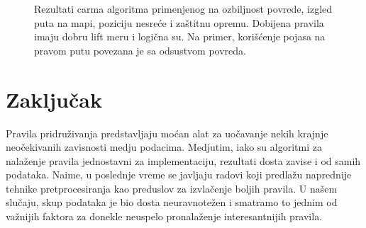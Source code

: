 \documentclass[a4paper,10pt]{article}
\begin{document}
\begin{figure}[h!]
 \centering
 \caption{Rezultati carma algoritma primenjenog na ozbiljnost povrede, izgled puta na mapi, poziciju nesreće i zaštitnu opremu. 
 Dobijena pravila imaju dobru lift meru i logična su. Na primer, korišćenje pojasa na pravom putu povezana je sa odsustvom povreda.  }
\end{figure}

\clearpage

\section{Zaključak}

Pravila pridruživanja predstavljaju moćan alat za uočavanje nekih krajnje 
neočekivanih zavisnosti medju podacima. Medjutim, iako su algoritmi za 
nalaženje pravila jednostavni za implementaciju, rezultati dosta zavise i od samih 
podataka. Naime, u poslednje vreme se javljaju radovi koji predlažu naprednije 
tehnike pretprocesiranja kao preduslov za izvlačenje boljih pravila.
U našem slučaju, skup podataka je bio dosta neuravnotežen i smatramo to jednim od 
važnijih faktora za donekle neuspelo pronalaženje interesantnijih pravila.
\end{document}
